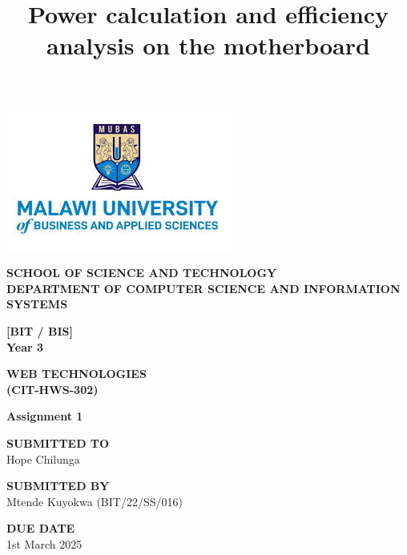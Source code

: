 \documentclass[a4paper,12pt]{article}
\title{Power calculation and efficiency analysis on the motherboard}
\begin{document}
\begin{titlepage}
    \centering
    \vspace*{1cm}
    \begin{center}
      
\includegraphics{logo.jpeg}
    \end{center}
    \textbf{SCHOOL OF SCIENCE AND TECHNOLOGY}\\
    \textbf{DEPARTMENT OF COMPUTER SCIENCE AND INFORMATION SYSTEMS}\\
    \vspace{2cm}

    \textbf{[BIT / BIS]}\\
    \textbf{Year 3}\\
    \vspace{1cm}

    \textbf{WEB TECHNOLOGIES}\\
    \textbf{(CIT-HWS-302)}\\
    \vspace{2cm}

    \textbf{Assignment 1}\\
    \vspace{2cm}

    \textbf{SUBMITTED TO}\\
    Hope Chilunga\\
    \vspace{1cm}

    \textbf{SUBMITTED BY}\\
    Mtende Kuyokwa (BIT/22/SS/016)\\
    \vspace{1cm}

    \textbf{DUE DATE}\\
    1st March 2025\\
    
    \vfill
\end{titlepage}
\end{document}
